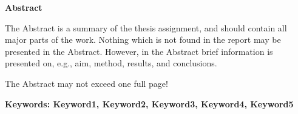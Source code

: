 \begin{mdframed}[innertopmargin=10pt, innerbottommargin=10pt, innerleftmargin=10pt, innerrightmargin=10pt, skipabove=10pt, skipbelow=10pt, roundcorner=10pt]
    \textbf{Abstract}
    
    The Abstract is a summary of the thesis assignment, and should contain all major parts of the work. Nothing which is not found in the report may be presented in the Abstract. However, in the Abstract brief information is presented on, e.g., aim, method, results, and conclusions.
    
    The Abstract may not exceed one full page!
    \end{mdframed}
    
\textbf{Keywords: Keyword1, Keyword2, Keyword3, Keyword4, Keyword5}
